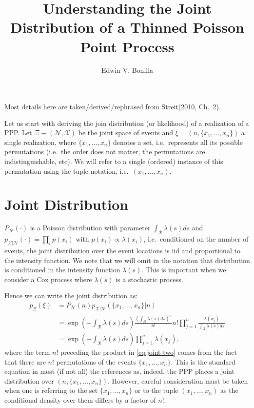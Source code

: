 \documentclass{article}
\title{Understanding the Joint Distribution of a Thinned Poisson Point Process}
\author{Edwin V. Bonilla}
\newcommand{\calR}{\mathcal{R}}
\newcommand{\ls}{\lambda(s)}
\begin{document}
	\maketitle
	Most details here are taken/derived/rephrased from Streit(2010, Ch.~2). 
	
	Let us start with deriving the join distribution (or likelihood) of a realization of a \gls{PPP}. Let $\Xi \equiv (\mathcal{N}, \mathcal{X})$  be the joint space of events and $\xi = (n, \{x_1, \ldots, x_n\})$ a single realization, where $\{x_1, \ldots, x_n \}$ denotes a set, i.e.~represents all its possible permutations (i.e.~the order does not matter, the permutations are indistinguishable, etc). We will refer to a single (ordered) instance of this permutation using the tuple notation, i.e.~$(x_1, \ldots, x_n)$.
	
	\section{Joint Distribution}
	
	$P_{\mathcal{N}}(\cdot)$ is a Poisson distribution with parameter $\int_{\calR} \ls ds$ and $p_{\mathcal{X} | \mathcal{N}} (\cdot) = \prod_{i} p(x_i)$ with $p(x_i) \propto   \lambda(x_i)$, i.e.~conditioned on the number of events, the joint distribution over the event locations is iid and proportional to the intensity function. We note that we will omit in the notation that distribution is conditioned in the intensity function $\ls$. This is important when we consider a Cox process where $\ls$ is a stochastic process. 
	  
	Hence we can write the joint distribution as:
	\begin{align}
	p_{\Xi}(\xi) &= P_{\mathcal{N}}(n) p_{\mathcal{X} | \mathcal{N}}(\{x_1, \ldots, x_n \} | n )\\
	\label{eq:joint-two}
	&= \exp\left(-\int_{\calR} \ls ds\right) \frac{\left(\int_{\calR} \ls ds \right)^{n}}{n!} n! \prod_{j=1}^{n}  \frac{\lambda(x_j)}{\int_{\calR} \lambda(s) ds} \\
	\label{eq:joint-three}
	&= \exp\left(-\int_{\calR} \ls ds\right) \prod_{j=1}^{n}  {\lambda(x_j)} \text{,}
	\end{align}
	where the term $n!$ preceding the product in \cref{eq:joint-two} comes from the fact that there are $n!$ permutations of the events $\{x_1, \ldots, x_n\}$. 
	This is the standard equation in most (if not all) the references as, indeed, the \gls{PPP} places a joint distribution over $(n, \{x_1, \ldots, x_n\})$. However, careful consideration must be taken when one is referring to the set $\{x_1, \ldots, x_n\}$ or to the tuple $(x_1, \ldots, x_n)$ as the conditional density over them differs by a factor of  $n!$.  
\end{document}

